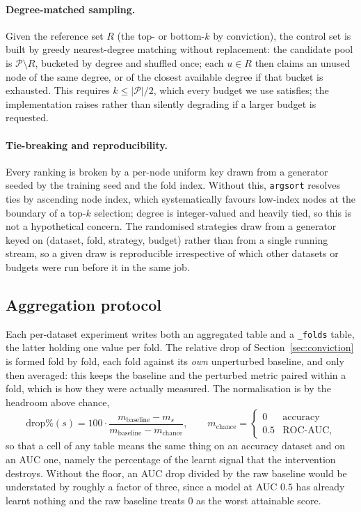 \paragraph{Degree-matched sampling.}
Given the reference set $R$ (the top- or bottom-$k$ by conviction), the control
set is built by greedy nearest-degree matching without replacement: the
candidate pool is $\mathcal{P} \setminus R$, bucketed by degree and shuffled
once; each $u \in R$ then claims an unused node of the same degree, or of the
closest available degree if that bucket is exhausted. This requires
$k \le |\mathcal{P}|/2$, which every budget we use satisfies; the implementation
raises rather than silently degrading if a larger budget is requested.

\paragraph{Tie-breaking and reproducibility.}
Every ranking is broken by a per-node uniform key drawn from a generator seeded
by the training seed and the fold index. Without this, \texttt{argsort} resolves
ties by ascending node index, which systematically favours low-index nodes at
the boundary of a top-$k$ selection; degree is integer-valued and heavily tied,
so this is not a hypothetical concern. The randomised strategies draw from a
generator keyed on (dataset, fold, strategy, budget) rather than from a single
running stream, so a given draw is reproducible irrespective of which other
datasets or budgets were run before it in the same job.

\subsection{Aggregation protocol}
\label{sec:supp_agg}

Each per-dataset experiment writes both an aggregated table and a
\texttt{\_folds} table, the latter holding one value per fold. The relative drop
of Section~\ref{sec:conviction} is formed fold by fold, each fold against its
\emph{own} unperturbed baseline, and only then averaged: this keeps the baseline
and the perturbed metric paired within a fold, which is how they were actually
measured. The normalisation is by the headroom above chance,
\[
    \mathrm{drop}\%(s) = 100 \cdot
    \frac{m_{\text{baseline}} - m_{s}}{m_{\text{baseline}} - m_{\text{chance}}},
    \qquad
    m_{\text{chance}} = \begin{cases} 0 & \text{accuracy} \\ 0.5 & \text{ROC-AUC},\end{cases}
\]
so that a cell of any table means the same thing on an accuracy dataset and on
an AUC one, namely the percentage of the learnt signal that the intervention
destroys. Without the floor, an AUC drop divided by the raw baseline would be
understated by roughly a factor of three, since a model at AUC $0.5$ has already
learnt nothing and the raw baseline treats $0$ as the worst attainable score.

